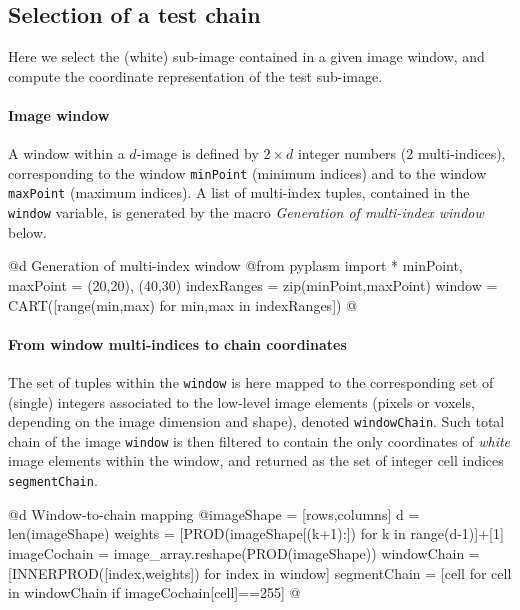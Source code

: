 \documentclass[11pt,oneside]{article}	%
\begin{document}
\subsection{Selection of a test chain}

Here we select the (white) sub-image contained in a given image window, and compute the coordinate representation of the test sub-image.

\paragraph{Image window}

A window within a $d$-image is defined by $2\times d$ integer numbers (2 multi-indices), corresponding to the window  \texttt{minPoint} (minimum indices) and to the window \texttt{maxPoint} (maximum indices). A list of multi-index tuples, contained in the \texttt{window} variable, is generated by the macro \emph{Generation of multi-index window} below.

@d Generation of multi-index window
@{from pyplasm import *
minPoint, maxPoint = (20,20), (40,30)
indexRanges = zip(minPoint,maxPoint)
window = CART([range(min,max) for min,max in indexRanges])
@}

\paragraph{From window multi-indices to chain coordinates}

The set of tuples within the \texttt{window} is here mapped to the corresponding set of (single) integers associated to the low-level image elements (pixels or voxels, depending on the image dimension and shape), denoted \texttt{windowChain}. Such total chain of the image \texttt{window} is then filtered to contain the only coordinates of \emph{white} image elements within the window, and returned as the set of integer cell indices \texttt{segmentChain}.

@d Window-to-chain mapping
@{imageShape = [rows,columns]
d = len(imageShape)
weights = [PROD(imageShape[(k+1):]) for k in range(d-1)]+[1]
imageCochain = image_array.reshape(PROD(imageShape))
windowChain = [INNERPROD([index,weights]) for index in window]
segmentChain = [cell for cell in windowChain if imageCochain[cell]==255]
@}
\end{document}
